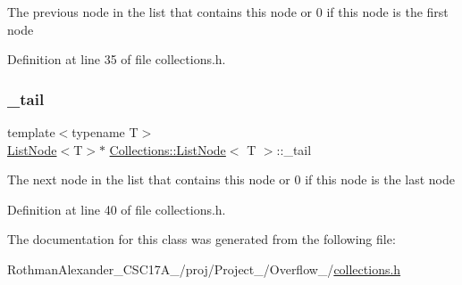 The previous node in the list that contains this node or 0 if this node is the first node 

Definition at line 35 of file collections.\+h.

\hypertarget{class_collections_1_1_list_node_a292ac07a1175ba5feecc79c7982bbf61}{}\label{class_collections_1_1_list_node_a292ac07a1175ba5feecc79c7982bbf61} 
\subsubsection{\texorpdfstring{\+\_\+tail}{\_tail}}
{\footnotesize\ttfamily template$<$typename T$>$ \\
\hyperlink{class_collections_1_1_list_node}{List\+Node}$<$T$>$$\ast$ \hyperlink{class_collections_1_1_list_node}{Collections\+::\+List\+Node}$<$ T $>$\+::\+\_\+tail\hspace{0.3cm}{\ttfamily [protected]}}

The next node in the list that contains this node or 0 if this node is the last node 

Definition at line 40 of file collections.\+h.



The documentation for this class was generated from the following file\+:\begin{DoxyCompactItemize}
\item 
Rothman\+Alexander\+\_\+\+C\+S\+C17\+A\+\_/proj/\+Project\+\_/\+Overflow\+\_/\hyperlink{collections_8h}{collections.\+h}\end{DoxyCompactItemize}
